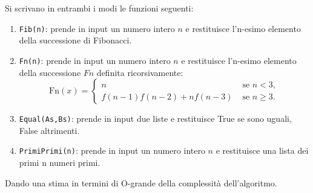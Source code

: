\documentclass[11pt,a4]{article}
\begin{document}
\begin{enumerate}
\begin{multicols}{2}

\end{multicols}


Si scrivano in entrambi i modi le funzioni seguenti:

\begin{enumerate}
\item {\tt Fib(n)}:  prende in input un numero intero $n$ e restituisce l'n-esimo elemento della successione di Fibonacci.
\item {\tt Fn(n)}: prende in input un numero intero $n$ e restituisce l'n-esimo elemento della successione $Fn$ definita ricorsivamente:
\begin{equation*}
\mbox{Fn}(x) = \left\{ \begin{array}{ll}
 n & \mbox{ se } n<3, \\
 f(n-1)f(n-2)+nf(n-3) & \mbox{ se } n\ge3.
\end{array} \right.
\end{equation*}
\item {\tt Equal(As,Bs)}: prende in input due liste e restituisce {True} se sono uguali, {False} altrimenti.
\item {\tt PrimiPrimi(n)}: prende in input un numero intero $n$ e restituisce una lista dei primi n numeri primi.
\end{enumerate}
Dando una stima in termini di O-grande della complessità dell'algoritmo.

\end{enumerate}
\end{document}
